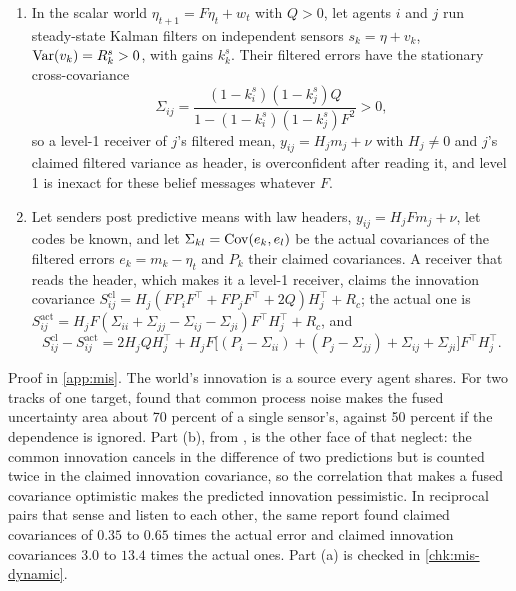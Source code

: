 \begin{proposition}\label{prop:mis-dynamic}
\begin{enumerate}
\item[(a)] In the scalar world $\eta_{t+1}=F\eta_t+w_t$ with $Q>0$, let agents $i$ and $j$ run steady-state Kalman filters on independent sensors $s_k=\eta+v_k$, $\operatorname{Var}(v_k)=R^s_k>0$, with gains $k^s_k$. Their filtered errors have the stationary cross-covariance
\begin{equation}\label{eq:mis-dynamic}
\Sigma_{ij}=\frac{(1-k^s_i)(1-k^s_j)Q}{1-(1-k^s_i)(1-k^s_j)F^2}>0,
\end{equation}
so a level-1 receiver of $j$'s filtered mean, $y_{ij}=H_jm_j+\nu$ with $H_j\neq0$ and $j$'s claimed filtered variance as header, is overconfident after reading it, and level 1 is inexact for these belief messages whatever $F$.
\item[(b)] Let senders post predictive means with law headers, $y_{ij}=H_jFm_j+\nu$, let codes be known, and let $\Sigma_{kl}=\operatorname{Cov}(e_k,e_l)$ be the actual covariances of the filtered errors $e_k=m_k-\eta_t$ and $P_k$ their claimed covariances. A receiver that reads the header, which makes it a level-1 receiver, claims the innovation covariance $S^{\mathrm{cl}}_{ij}=H_j(FP_iF^\top+FP_jF^\top+2Q)H_j^\top+R_c$; the actual one is $S^{\mathrm{act}}_{ij}=H_jF(\Sigma_{ii}+\Sigma_{jj}-\Sigma_{ij}-\Sigma_{ji})F^\top H_j^\top+R_c$, and
\begin{equation}\label{eq:mis-innovation-bias}
S^{\mathrm{cl}}_{ij}-S^{\mathrm{act}}_{ij}=2H_jQH_j^\top+H_jF\bigl[(P_i-\Sigma_{ii})+(P_j-\Sigma_{jj})+\Sigma_{ij}+\Sigma_{ji}\bigr]F^\top H_j^\top .
\end{equation}
\end{enumerate}
\end{proposition}

Proof in \cref{app:mis}. The world's innovation is a source every agent shares. For two tracks of one target, \citet{barshalom1986effect} found that common process noise makes the fused uncertainty area about 70 percent of a single sensor's, against 50 percent if the dependence is ignored. Part (b), from \citet{dennis2026communicating}, is the other face of that neglect: the common innovation cancels in the difference of two predictions but is counted twice in the claimed innovation covariance, so the correlation that makes a fused covariance optimistic makes the predicted innovation pessimistic. In reciprocal pairs that sense and listen to each other, the same report found claimed covariances of $0.35$ to $0.65$ times the actual error and claimed innovation covariances $3.0$ to $13.4$ times the actual ones. Part (a) is checked in \cref{chk:mis-dynamic}.

